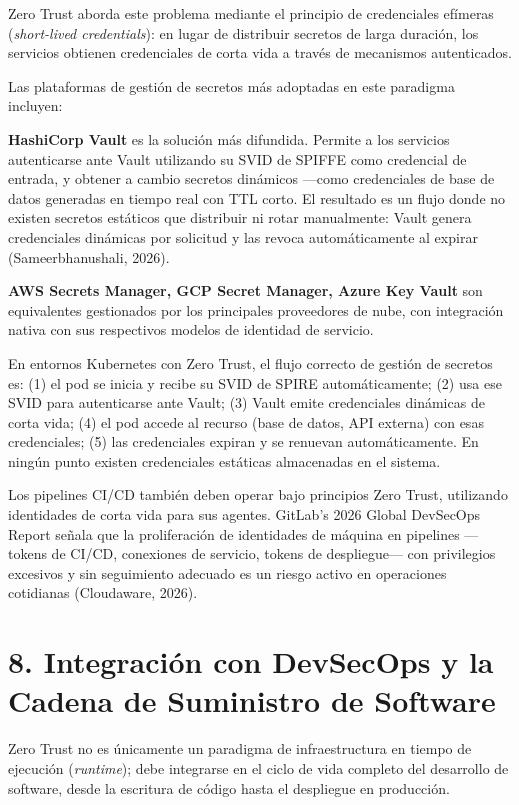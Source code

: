 \documentclass[12pt,a4paper]{article}
\begin{document}
Zero Trust aborda este problema mediante el principio de credenciales efímeras (\textit{short-lived credentials}): en lugar de distribuir secretos de larga duración, los servicios obtienen credenciales de corta vida a través de mecanismos autenticados.

Las plataformas de gestión de secretos más adoptadas en este paradigma incluyen:

\textbf{HashiCorp Vault} es la solución más difundida. Permite a los servicios autenticarse ante Vault utilizando su SVID de SPIFFE como credencial de entrada, y obtener a cambio secretos dinámicos —como credenciales de base de datos generadas en tiempo real con TTL corto. El resultado es un flujo donde no existen secretos estáticos que distribuir ni rotar manualmente: Vault genera credenciales dinámicas por solicitud y las revoca automáticamente al expirar (Sameerbhanushali, 2026).

\textbf{AWS Secrets Manager, GCP Secret Manager, Azure Key Vault} son equivalentes gestionados por los principales proveedores de nube, con integración nativa con sus respectivos modelos de identidad de servicio.

En entornos Kubernetes con Zero Trust, el flujo correcto de gestión de secretos es: (1) el pod se inicia y recibe su SVID de SPIRE automáticamente; (2) usa ese SVID para autenticarse ante Vault; (3) Vault emite credenciales dinámicas de corta vida; (4) el pod accede al recurso (base de datos, API externa) con esas credenciales; (5) las credenciales expiran y se renuevan automáticamente. En ningún punto existen credenciales estáticas almacenadas en el sistema.

Los pipelines CI/CD también deben operar bajo principios Zero Trust, utilizando identidades de corta vida para sus agentes. GitLab's 2026 Global DevSecOps Report señala que la proliferación de identidades de máquina en pipelines —tokens de CI/CD, conexiones de servicio, tokens de despliegue— con privilegios excesivos y sin seguimiento adecuado es un riesgo activo en operaciones cotidianas (Cloudaware, 2026).



\section{8. Integración con DevSecOps y la Cadena de Suministro de Software}

Zero Trust no es únicamente un paradigma de infraestructura en tiempo de ejecución (\textit{runtime}); debe integrarse en el ciclo de vida completo del desarrollo de software, desde la escritura de código hasta el despliegue en producción.
\end{document}
